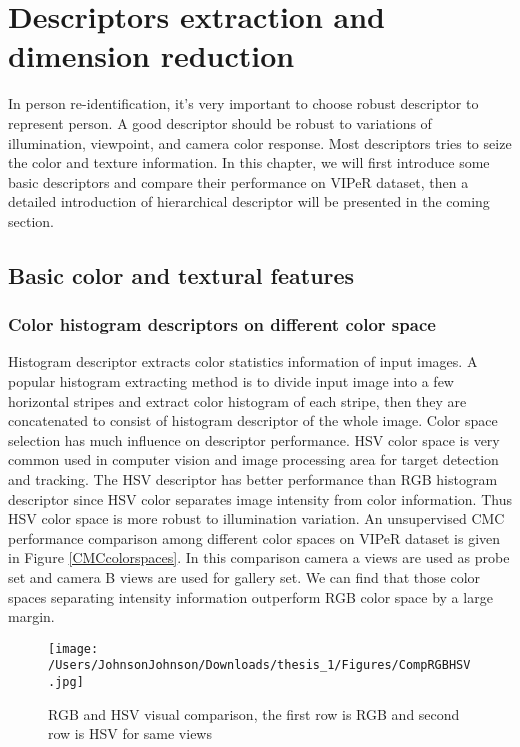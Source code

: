 \chapter{Descriptors extraction and dimension reduction}
In person re-identification, it's very important to choose robust descriptor to represent person. A good descriptor should be robust to variations of illumination, viewpoint, and camera color response. Most descriptors tries to seize the color and texture information. In this chapter, we will first introduce some basic descriptors and compare their performance on VIPeR dataset, then a detailed introduction of hierarchical descriptor will be presented in the coming section.


\section{Basic color and textural features}
\subsection{Color histogram descriptors on different color space}
Histogram descriptor extracts color statistics information of input images. A popular histogram extracting method is to divide input image into a few horizontal stripes and extract color histogram of each stripe, then they are concatenated to consist of histogram descriptor of the whole image. Color space selection has much influence on descriptor performance. HSV color space is very common used in computer vision and image processing area for target detection and tracking. The HSV descriptor has better performance than RGB histogram descriptor since HSV color separates image intensity from color information. Thus HSV color space is more robust to illumination variation. An unsupervised CMC performance comparison among different color spaces on VIPeR dataset is given in Figure \ref{CMCcolorspaces}. In this comparison camera a views are used as probe set and camera B views are used for gallery set. We can find that those color spaces separating intensity information outperform RGB color space by a large margin.

\begin{figure}[H]
\centering
\texttt{[image: /Users/JohnsonJohnson/Downloads/thesis\_1/Figures/CompRGBHSV.jpg]}
\caption{RGB and HSV visual comparison, the first row is RGB and second row is HSV for same views }
\vspace{0em}
\end{figure} 

